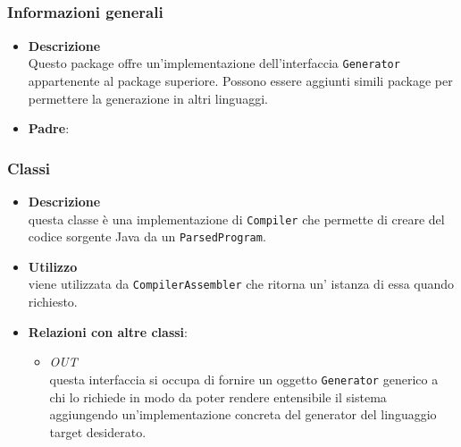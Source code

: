 \subsection{}
\label{\nogloxy{swedesigner::server::generator::java}}
\subsubsection{Informazioni generali}
\begin{itemize}
\item \textbf{Descrizione}\\
Questo package offre un'implementazione dell'interfaccia \texttt{Generator} appartenente al package superiore. Possono essere aggiunti simili package per permettere la generazione in altri linguaggi.
\item \textbf{Padre}: \hyperref[\nogloxy{swedesigner::server::generator}]{}
\end{itemize}
\subsubsection{Classi}
\label{\nogloxy{swedesigner::server::generator::java::JavaGenerator}}
\begin{itemize}
\item \textbf{Descrizione}\\
questa classe è una implementazione di \texttt{Compiler} che permette di creare del codice sorgente Java da un \texttt{ParsedProgram}.
\item \textbf{Utilizzo}\\
viene utilizzata da \texttt{CompilerAssembler} che ritorna un' istanza di essa quando richiesto.
\item \textbf{Relazioni con altre classi}:
\begin{itemize}
\item \textit{OUT} \hyperref[\nogloxy{swedesigner::server::generator::Generator}]{}\\
questa interfaccia si occupa di fornire un oggetto \texttt{Generator} generico a chi lo richiede in modo da poter rendere entensibile il sistema aggiungendo un'implementazione concreta del generator del linguaggio target desiderato.
\end{itemize}
\end{itemize}
\subsection{}
\label{\nogloxy{swedesigner::server::parser}}
